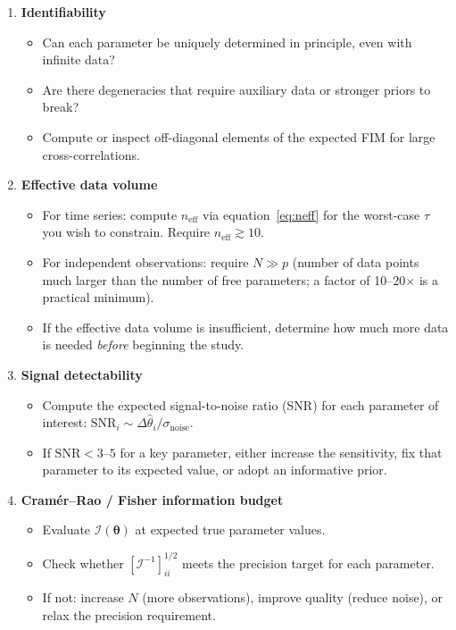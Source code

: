 \documentclass[11pt, a4paper]{article}
\begin{document}
\begin{enumerate}[label=\textbf{\arabic*.}, leftmargin=*, itemsep=6pt]

    \item \textbf{Identifiability}
    \begin{itemize}[noitemsep]
        \item Can each parameter be uniquely determined in principle, even with infinite data?
        \item Are there degeneracies that require auxiliary data or stronger priors to break?
        \item Compute or inspect off-diagonal elements of the expected FIM for large
              cross-correlations.
    \end{itemize}

    \item \textbf{Effective data volume}
    \begin{itemize}[noitemsep]
        \item For time series: compute $n_\mathrm{eff}$ via equation~\eqref{eq:neff}
              for the worst-case $\tau$ you wish to constrain. Require $n_\mathrm{eff} \gtrsim 10$.
        \item For independent observations: require $N \gg p$ (number of data points
              much larger than the number of free parameters; a factor of 10--20$\times$
              is a practical minimum).
        \item If the effective data volume is insufficient, determine how much more data
              is needed \textit{before} beginning the study.
    \end{itemize}

    \item \textbf{Signal detectability}
    \begin{itemize}[noitemsep]
        \item Compute the expected signal-to-noise ratio (SNR) for each parameter of
              interest: $\mathrm{SNR}_i \sim \Delta\hat{\theta}_i / \sigma_\mathrm{noise}$.
        \item If $\mathrm{SNR} < 3$--$5$ for a key parameter, either increase the
              sensitivity, fix that parameter to its expected value, or adopt an
              informative prior.
    \end{itemize}

    \item \textbf{Cram\'{e}r--Rao / Fisher information budget}
    \begin{itemize}[noitemsep]
        \item Evaluate $\mathcal{I}(\boldsymbol{\theta})$ at expected true parameter values.
        \item Check whether $\left[\mathcal{I}^{-1}\right]_{ii}^{1/2}$ meets the precision
              target for each parameter.
        \item If not: increase $N$ (more observations), improve quality (reduce noise),
              or relax the precision requirement.
    \end{itemize}


\end{enumerate}
\end{document}
